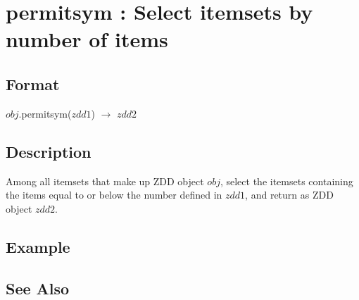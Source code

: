 
\section{permitsym : Select itemsets by number of items\label{sect:permitsym}}
\subsection*{Format}
$obj$.permitsym($zdd1$) $\rightarrow$ $zdd2$

\subsection*{Description}
Among all itemsets that make up ZDD object $obj$, select the itemsets containing the  items equal to or below the number defined in $zdd1$, and return as ZDD object $zdd2$. 

\subsection*{Example}


\subsection*{See Also}
